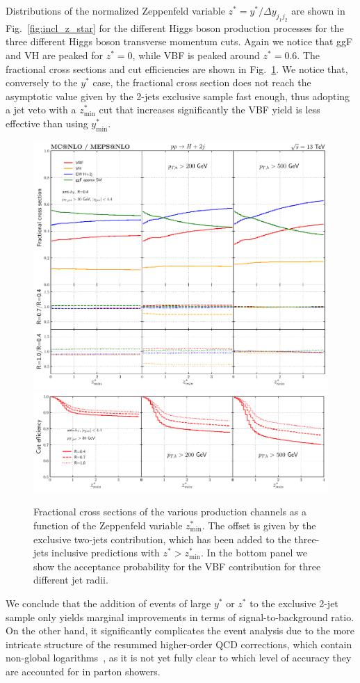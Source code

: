 \documentclass[10pt,prd,fleqn,superscriptaddress,notitlepage,nofootinbib,preprintnumbers,nobalancelastpage]{revtex4-1}
\newcommand{\VBF}{VBF\xspace}
\newcommand{\VH}{VH\xspace}
\begin{document}
Distributions of the normalized Zeppenfeld variable $z^*= y^*/\Delta y_{j_1 j_2}$ are shown in Fig.~\ref{fig:incl_z_star} for the different Higgs boson production processes for the three different Higgs boson transverse momentum cuts. Again we notice that ggF and \VH are peaked for $z^*=0$, while \VBF{} is peaked around $z^*=0.6$.
The fractional cross sections and cut efficiencies are shown in Fig.~\ref{fig:incl_z_star_fraction}.
We notice that, conversely to the $y^*$ case, the fractional cross section does not reach the asymptotic value given by the 2-jets exclusive sample fast enough, thus adopting a jet veto with a $z^*_{\min}$ cut that increases significantly the \VBF{} yield is less effective than using $y^*_{\min}$.

\begin{figure}[t]
  \centering
  \includegraphics[width=.65\textwidth]{figures/vbf/z_star.pdf}
  \includegraphics[width=.65\textwidth]{figures/vbf/z_star_frac.pdf}
\caption{Fractional cross sections of the various production channels as a function of the Zeppenfeld variable $z^*_{\min}$.
The offset is given by the exclusive two-jets contribution, which has been added to the three-jets inclusive predictions with $z^*>z^*_{\min}$.
In the bottom panel we show the acceptance probability for the \VBF{} contribution for three different jet radii.}
\label{fig:incl_z_star_fraction}
\end{figure}
We conclude that the addition of events of large $y^*$ or $z^*$ to the exclusive 2-jet sample only yields marginal improvements in terms of signal-to-background ratio. On the other hand, it significantly complicates the event analysis due to the more intricate structure of the resummed higher-order QCD corrections, which contain non-global logarithms~\cite{Forshaw:2009fz,DuranDelgado:2011tp}, as it is not yet fully clear to which level of accuracy they are accounted for in parton showers.
\end{document}
